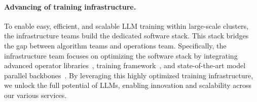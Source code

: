 
\paragraph{Advancing of training infrastructure.}
To enable easy, efficient, and scalable LLM training within large-scale clusters, the infrastructure teams build the dedicated software stack. This stack bridges the gap between algorithm teams and operations team. Specifically, the infrastructure team focuses on optimizing the software stack by integrating advanced operator libraries~\cite{cublas2024,cutlass2024,nccl2024}, training framework~\cite{paszkePyTorchImperative}, and state-of-the-art model parallel backbones~\cite{zhaoPyTorchFSDP,shoeybiMegatronLMTraining,liangTorchTitanOnestop,ivchenkoTorchRecPyTorch}.
By leveraging this highly optimized training infrastructure, we unlock the full potential of LLMs, enabling innovation and scalability across our various services. 



